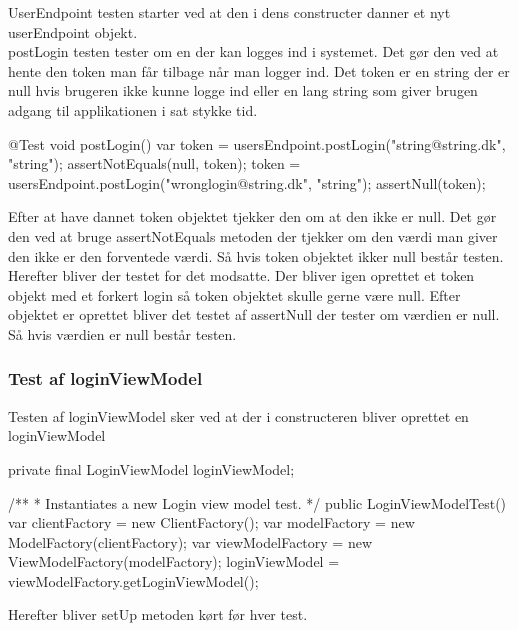 UserEndpoint testen starter ved at den i dens constructer danner et nyt userEndpoint objekt. \\
postLogin testen tester om en der kan logges ind i systemet. Det gør den ved at hente den token man får tilbage når man logger ind. Det token er en string der er null hvis brugeren ikke kunne logge ind eller en lang string som giver brugen adgang til applikationen i sat stykke tid. \\
    

\begin{code}[caption=UsersEndpointTest.java, firstnumber=34]
@Test
void postLogin() {
    var token = usersEndpoint.postLogin("string@string.dk", "string");
    assertNotEquals(null, token);
    token = usersEndpoint.postLogin("wronglogin@string.dk", "string");
    assertNull(token);
}
\end{code}    

Efter at have dannet token objektet tjekker den om at den ikke er null. Det gør den ved at bruge assertNotEquals metoden der tjekker om den værdi man giver den ikke er den forventede værdi. Så hvis token objektet ikker null består testen. \\

Herefter bliver der testet for det modsatte. Der bliver igen oprettet et token objekt med et forkert login så token objektet skulle gerne være null. Efter objektet er oprettet bliver det testet af assertNull der tester om værdien er null. Så hvis værdien er null består testen. \\

\subsubsection{Test af loginViewModel}
Testen af loginViewModel sker ved at der i constructeren bliver oprettet en loginViewModel\\
\begin{code}[caption=LoginViewModel.java, firstnumber=16]
private final LoginViewModel loginViewModel;

/**
 * Instantiates a new Login view model test.
 */
public LoginViewModelTest() {
    var clientFactory = new ClientFactory();
    var modelFactory = new ModelFactory(clientFactory);
    var viewModelFactory = new ViewModelFactory(modelFactory);
    loginViewModel = viewModelFactory.getLoginViewModel();
}
\end{code}

Herefter bliver setUp metoden kørt før hver test.\\

